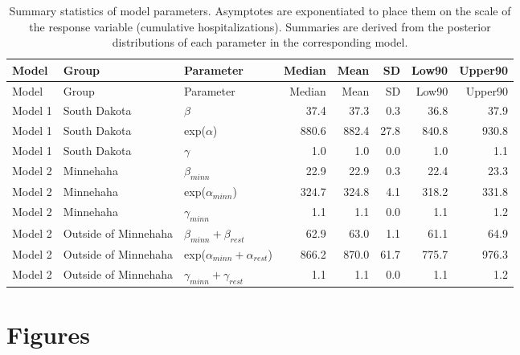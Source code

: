 \documentclass[
]{article}
\begin{document}
\newpage

\FloatBarrier

\begin{longtable}[]{@{}lllrrrrr@{}}
\caption{\label{tab:unnamed-chunk-2}Summary statistics of model parameters. Asymptotes are exponentiated to place them on the scale of the response variable (cumulative hospitalizations). Summaries are derived from the posterior distributions of each parameter in the corresponding model.}\tabularnewline
\toprule
Model & Group & Parameter & Median & Mean & SD & Low90 & Upper90\tabularnewline
\midrule
\endfirsthead
\toprule
Model & Group & Parameter & Median & Mean & SD & Low90 & Upper90\tabularnewline
\midrule
\endhead
Model 1 & South Dakota & \(\beta\) & 37.4 & 37.3 & 0.3 & 36.8 & 37.9\tabularnewline
Model 1 & South Dakota & exp(\(\alpha\)) & 880.6 & 882.4 & 27.8 & 840.8 & 930.8\tabularnewline
Model 1 & South Dakota & \(\gamma\) & 1.0 & 1.0 & 0.0 & 1.0 & 1.1\tabularnewline
Model 2 & Minnehaha & \(\beta_{minn}\) & 22.9 & 22.9 & 0.3 & 22.4 & 23.3\tabularnewline
Model 2 & Minnehaha & exp(\(\alpha_{minn}\)) & 324.7 & 324.8 & 4.1 & 318.2 & 331.8\tabularnewline
Model 2 & Minnehaha & \(\gamma_{minn}\) & 1.1 & 1.1 & 0.0 & 1.1 & 1.2\tabularnewline
Model 2 & Outside of Minnehaha & \(\beta_{minn} + \beta_{rest}\) & 62.9 & 63.0 & 1.1 & 61.1 & 64.9\tabularnewline
Model 2 & Outside of Minnehaha & exp(\(\alpha_{minn} + \alpha_{rest}\)) & 866.2 & 870.0 & 61.7 & 775.7 & 976.3\tabularnewline
Model 2 & Outside of Minnehaha & \(\gamma_{minn} + \gamma_{rest}\) & 1.1 & 1.1 & 0.0 & 1.1 & 1.2\tabularnewline
\bottomrule
\end{longtable}

\newpage

\FloatBarrier

\hypertarget{figures}{%
\section{Figures}\label{figures}}
\end{document}
